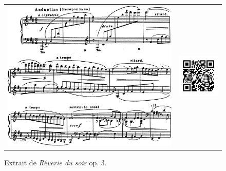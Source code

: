 \begin{figure}[!p]
  \begin{bigcenter}
    \begin{tabular}{lr}
      \includegraphics[width=12.5cm, keepaspectratio]{op3.png}
      &
      \includegraphics[width=3cm, keepaspectratio]{op3-qr.png}
    \end{tabular}
  \end{bigcenter}
  \caption{\label{op3}Extrait de \emph{Rêverie du soir} op. 3.}
\end{figure}

